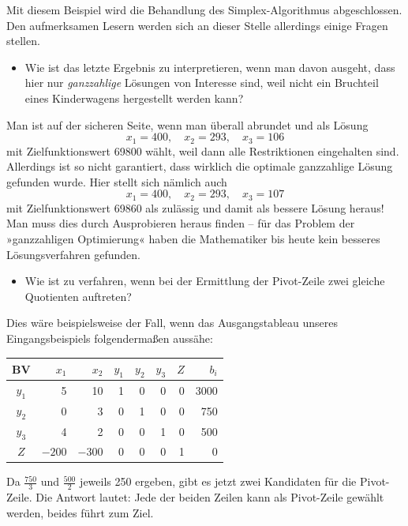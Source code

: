 Mit diesem Beispiel wird die Behandlung des Simplex-Algorithmus abgeschlossen. Den aufmerksamen Lesern werden sich an dieser Stelle allerdings einige Fragen stellen.
\begin{itemize}
  \item Wie ist das letzte Ergebnis zu interpretieren, wenn man davon ausgeht, dass hier nur \emph{ganzzahlige} Lösungen von Interesse sind, weil nicht ein Bruchteil eines Kinderwagens hergestellt werden kann?
\end{itemize}
Man ist auf der sicheren Seite, wenn man überall abrundet und als Lösung
\[ x_1 = 400, \quad x_2 = 293, \quad x_3 = 106 \]
mit Zielfunktionswert 69800 wählt, weil dann alle Restriktionen eingehalten sind. Allerdings ist so nicht garantiert, dass wirklich die optimale ganzzahlige Lösung gefunden wurde. Hier stellt sich nämlich auch
\[ x_1 = 400, \quad x_2 = 293, \quad x_3 = 107 \]
mit Zielfunktionswert 69860 als zulässig und damit als bessere Lösung heraus! Man muss dies durch Ausprobieren heraus finden -- für das Problem der »ganzzahligen Optimierung« haben die Mathematiker bis heute kein besseres Lösungsverfahren gefunden.

\begin{itemize}
  \item Wie ist zu verfahren, wenn bei der Ermittlung der Pivot-Zeile zwei gleiche Quotienten auftreten?
\end{itemize}
Dies wäre beispielsweise der Fall, wenn das Ausgangstableau unseres Eingangsbeispiels folgendermaßen aussähe:

\begin{center}
  \begin{tabular}{|c|r|r|r|r|r|r|r|}
    \hline
    BV & $x_1$ & $x_2$ & $y_1$ & $y_2$ & $y_3$ & $Z$ & $b_i$\\
    \hline
    $y_1$ & 5 & 10 & 1 & 0 & 0 & 0 & 3000\\
    $y_2$ & 0 & 3 & 0 & 1 & 0 & 0 & 750\\
    $y_3$ & 4 & 2 & 0 & 0 & 1 & 0 & 500\\
    $Z$ & $-200$ & $-300$ & 0 & 0 & 0 & 1 & 0\\
    \hline
  \end{tabular}
\end{center}

Da $\tfrac{750}{3}$ und $\tfrac{500}{2}$ jeweils 250 ergeben, gibt es jetzt zwei Kandidaten für die Pivot-Zeile. Die Antwort lautet: Jede der beiden Zeilen kann als Pivot-Zeile gewählt werden, beides führt zum Ziel.

